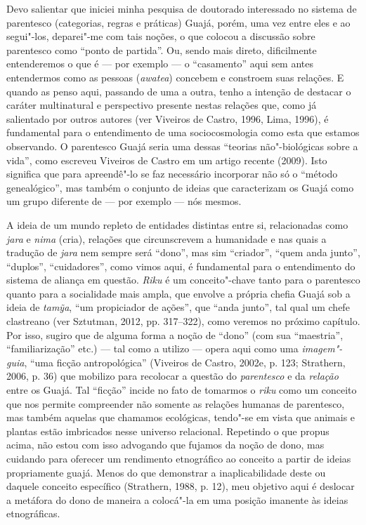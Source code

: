 Devo salientar que iniciei minha pesquisa de doutorado interessado no
sistema de parentesco (categorias, regras e práticas) Guajá, porém, uma
vez entre eles e ao segui"-los, deparei"-me com tais noções, o que colocou
a discussão sobre parentesco como ``ponto de partida''. Ou, sendo mais
direto, dificilmente entenderemos o que é --- por exemplo --- o
``casamento'' aqui sem antes entendermos como as pessoas (\emph{awatea})
concebem e constroem suas relações. E quando as penso aqui, passando de
uma a outra, tenho a intenção de destacar o caráter multinatural e
perspectivo presente nestas relações que, como já salientado por outros
autores (ver Viveiros de Castro, 1996, Lima, 1996), é fundamental para o
entendimento de uma sociocosmologia como esta que estamos observando. O
parentesco Guajá seria uma dessas ``teorias não"-biológicas sobre a
vida'', como escreveu Viveiros de Castro em um artigo recente (2009).
Isto significa que para apreendê"-lo se faz necessário incorporar não só
o ``método genealógico'', mas também o conjunto de ideias que
caracterizam os Guajá como um grupo diferente de --- por exemplo --- nós
mesmos.

A ideia de um mundo repleto de entidades distintas entre si,
relacionadas como \emph{jara} e \emph{nima} (cria), relações que
circunscrevem a humanidade e nas quais a tradução de \emph{jara} nem
sempre será ``dono'', mas sim ``criador'', ``quem anda junto'', ``duplos'',
``cuidadores'', como vimos aqui, é fundamental para o entendimento do
sistema de aliança em questão. \emph{Riku} é um conceito"-chave tanto
para o parentesco quanto para a socialidade mais ampla, que envolve a
própria chefia Guajá sob a ideia de \emph{tamỹa}, ``um propiciador de
ações'', que ``anda junto'', tal qual um chefe clastreano (ver Sztutman,
2012, pp. 317--322), como veremos no próximo capítulo. Por isso, sugiro que de
alguma forma a noção de ``dono'' (com sua ``maestria'', ``familiarização''
etc.) --- tal como a utilizo --- opera aqui como uma \emph{imagem"-guia},
``uma ficção antropológica'' (Viveiros de Castro, 2002e, p. 123; Strathern,
2006, p. 36) que mobilizo para recolocar a questão do \emph{parentesco} e da
\emph{relação} entre os Guajá. Tal ``ficção'' incide no fato de tomarmos o
\emph{riku} como um conceito que nos permite compreender não somente as
relações humanas de parentesco, mas também aquelas que chamamos
ecológicas, tendo"-se em vista que animais e plantas estão imbricados
nesse universo relacional. Repetindo o que propus acima, não estou com
isso advogando que fujamos da noção de dono, mas cuidando para oferecer
um rendimento etnográfico ao conceito a partir de ideias propriamente
guajá. Menos do que demonstrar a inaplicabilidade deste ou daquele
conceito específico (Strathern, 1988, p. 12), meu objetivo aqui é deslocar
a metáfora do dono de maneira a colocá"-la em uma posição imanente às
ideias etnográficas.

